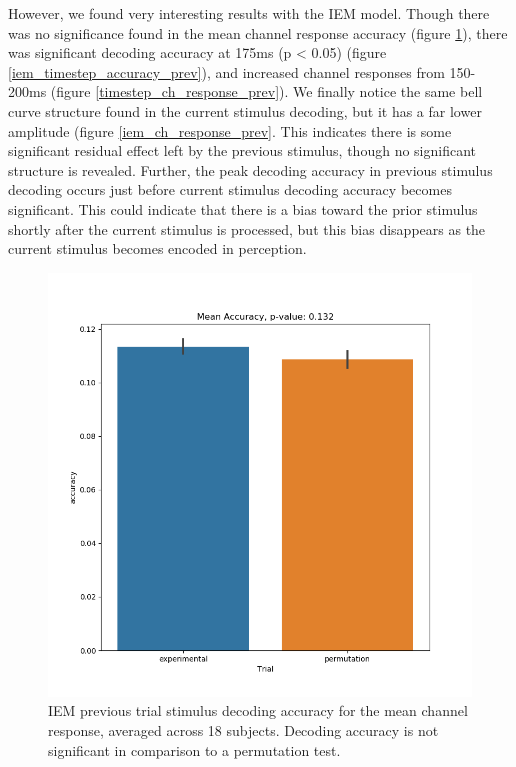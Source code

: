 \documentclass[../main.tex]{subfiles}
\begin{document}
However, we found very interesting results with the IEM model. Though there was no significance found in the mean channel response accuracy (figure \ref{iem_accuracy_prev}), there was significant decoding accuracy at 175ms (p < 0.05) (figure \ref{iem_timestep_accuracy_prev}), and increased channel responses from 150-200ms (figure \ref{timestep_ch_response_prev}). We finally notice the same bell curve structure found in the current stimulus decoding, but it has a far lower amplitude (figure \ref{iem_ch_response_prev}. This indicates there is some significant residual effect left by the previous stimulus, though no significant structure is revealed. Further, the peak decoding accuracy in previous stimulus decoding occurs just before current stimulus decoding accuracy becomes significant. This could indicate that there is a bias toward the prior stimulus shortly after the current stimulus is processed, but this bias disappears as the current stimulus becomes encoded in perception.

\begin{figure}
    \centering
    \includegraphics[scale=0.7]{figures/results/accuracy_prev_iem.png}
    \caption{IEM previous trial stimulus decoding accuracy for the mean channel response, averaged across 18 subjects. Decoding accuracy is not significant in comparison to a permutation test.}
    \label{iem_accuracy_prev}
\end{figure}
\end{document}
